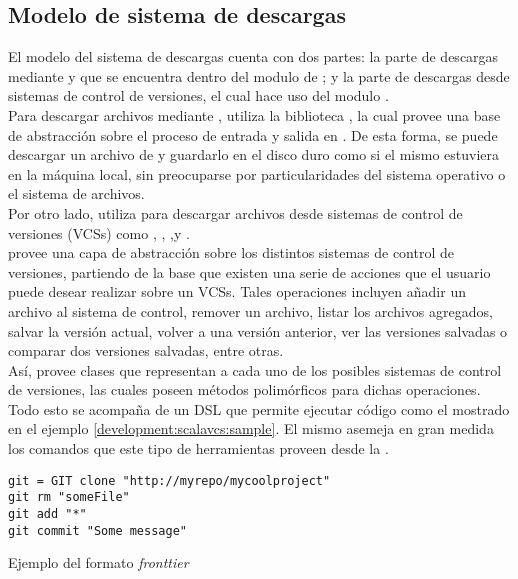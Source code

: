 \subsection{Modelo de sistema de descargas}

El modelo del sistema de descargas cuenta con dos partes: la parte de descargas 
mediante \http y que se encuentra dentro del modulo de \fronttier; y la parte 
de descargas desde sistemas de control de versiones, el cual hace uso del 
modulo \scalavcs.\\
Para descargar archivos mediante \http, \fronttier utiliza la biblioteca 
, la cual provee una base de abstracción sobre el proceso de 
entrada y salida en \scala. De esta forma, se puede descargar un archivo de 
\internet y guardarlo en el disco duro como si el mismo estuviera en la máquina 
local, sin preocuparse por particularidades del sistema operativo o el sistema 
de archivos.\\
Por otro lado, \fronttier utiliza \scalavcs para descargar archivos desde 
sistemas de control de versiones (VCSs) como \git, \svn, \cvs,\bazaar y 
\mercurial.\\
\scalavcs provee una capa de abstracción sobre los distintos sistemas de 
control de versiones, partiendo de la base que existen una serie de acciones 
que el usuario puede desear realizar sobre un VCSs. Tales operaciones incluyen 
añadir un archivo al sistema de control, remover un archivo, listar los 
archivos agregados, salvar la versión actual, volver a una versión anterior, 
ver las versiones salvadas o comparar dos versiones salvadas, entre otras.\\
Así, \scalavcs provee clases que representan a cada uno de los posibles 
sistemas de control de versiones, las cuales poseen métodos polimórficos para 
dichas operaciones. Todo esto se acompaña de un DSL que permite ejecutar código 
como el mostrado en el ejemplo \ref{development:scalavcs:sample}. El mismo 
asemeja en gran medida los comandos que este tipo de herramientas proveen desde 
la \cli.\\

\begin{listing}[ht]
	\begin{verbatim}
git = GIT clone "http://myrepo/mycoolproject"
git rm "someFile"
git add "*"
git commit "Some message"
	\end{verbatim}
	\caption{Ejemplo del formato \emph{fronttier}}
	\label{development:scalavcs:sample}
\end{listing}

